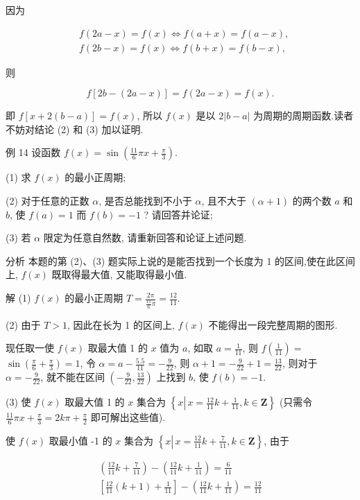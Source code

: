 	因为

	$$
		\begin{aligned}
			 & f(2 a-x)=f(x) \Leftrightarrow f(a+x)=f(a-x), \\
			 & f(2 b-x)=f(x) \Leftrightarrow f(b+x)=f(b-x),
		\end{aligned}
	$$

	则

	$$
		f[2 b-(2 a-x)]=f(2 a-x)=f(x) .
	$$

	即 $f[x+2(b-a)]=f(x)$, 所以 $f(x)$ 是以 $2|b-a|$ 为周期的周期函数.读者不妨对结论 (2) 和 (3) 加以证明.

	例 14 设函数 $f(x)=\sin \left(\frac{11}{6} \pi x+\frac{\pi}{3}\right)$.

	(1) 求 $f(x)$ 的最小正周期;

	(2) 对于任意的正数 $\alpha$, 是否总能找到不小于 $\alpha$, 且不大于 $(\alpha+1)$ 的两个数 $a$ 和 $b$, 使 $f(a)=1$ 而 $f(b)=-1$ ? 请回答并论证;

	(3) 若 $\alpha$ 限定为任意自然数, 请重新回答和论证上述问题.

	分析 本题的第 (2)、(3) 题实际上说的是能否找到一个长度为 1 的区间,使在此区间上, $f(x)$ 既取得最大值, 又能取得最小值.

	解 (1) $f(x)$ 的最小正周期 $T=\frac{2 \pi}{\frac{11}{6} \pi}=\frac{12}{11}$.

	(2) 由于 $T>1$, 因此在长为 1 的区间上, $f(x)$ 不能得出一段完整周期的图形.

	现任取一使 $f(x)$ 取最大值 1 的 $x$ 值为 $a$, 如取 $a=\frac{1}{11}$, 则 $f\left(\frac{1}{11}\right)=$ $\sin \left(\frac{\pi}{6}+\frac{\pi}{3}\right)=1$, 令 $\alpha=a-\frac{5.5}{11}=-\frac{9}{22}$, 则 $\alpha+1=-\frac{9}{22}+1=\frac{13}{22}$, 则对于 $\alpha=-\frac{9}{22}$, 就不能在区间 $\left(-\frac{9}{22}, \frac{13}{22}\right)$ 上找到 $b$, 使 $f(b)=-1$.

	(3) 使 $f(x)$ 取最大值 1 的 $x$ 集合为 $\left\{x \left\lvert\, x=\frac{12}{11} k+\frac{1}{11}\right., k \in \mathbf{Z}\right\}$ (只需令 $\frac{11}{6} \pi x+\frac{\pi}{3}=2 k \pi+\frac{\pi}{2}$ 即可解出这些值).

	使 $f(x)$ 取最小值 -1 的 $x$ 集合为 $\left\{x \left\lvert\, x=\frac{12}{11} k+\frac{7}{11}\right., k \in \mathbf{Z}\right\}$, 由于

	$$
		\begin{gathered}
			\left(\frac{12}{11} k+\frac{7}{11}\right)-\left(\frac{12}{11} k+\frac{1}{11}\right)=\frac{6}{11} \\
			{\left[\frac{12}{11}(k+1)+\frac{1}{11}\right]-\left(\frac{12}{11} k+\frac{1}{11}\right)=\frac{12}{11}}
		\end{gathered}
	$$

